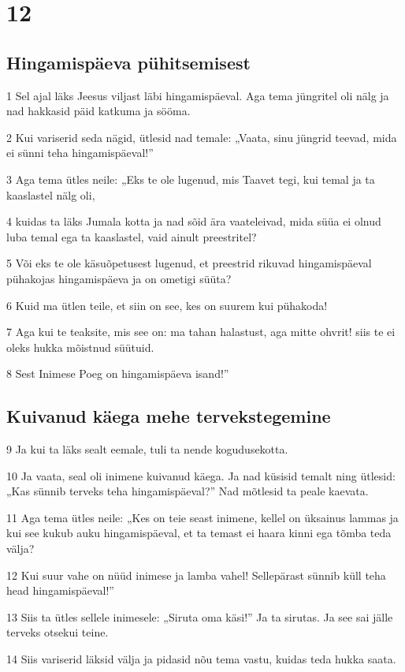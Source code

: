 \chapter{12}

\section*{Hingamispäeva pühitsemisest}

\par 1 Sel ajal läks Jeesus viljast läbi hingamispäeval. Aga tema jüngritel oli nälg ja nad hakkasid päid katkuma ja sööma.
\par 2 Kui variserid seda nägid, ütlesid nad temale: „Vaata, sinu jüngrid teevad, mida ei sünni teha hingamispäeval!”
\par 3 Aga tema ütles neile: „Eks te ole lugenud, mis Taavet tegi, kui temal ja ta kaaslastel nälg oli,
\par 4 kuidas ta läks Jumala kotta ja nad sõid ära vaateleivad, mida süüa ei olnud luba temal ega ta kaaslastel, vaid ainult preestritel?
\par 5 Või eks te ole käsuõpetusest lugenud, et preestrid rikuvad hingamispäeval pühakojas hingamispäeva ja on ometigi süüta?
\par 6 Kuid ma ütlen teile, et siin on see, kes on suurem kui pühakoda!
\par 7 Aga kui te teaksite, mis see on: ma tahan halastust, aga mitte ohvrit! siis te ei oleks hukka mõistnud süütuid.
\par 8 Sest Inimese Poeg on hingamispäeva isand!”

\section*{Kuivanud käega mehe tervekstegemine}

\par 9 Ja kui ta läks sealt eemale, tuli ta nende kogudusekotta.
\par 10 Ja vaata, seal oli inimene kuivanud käega. Ja nad küsisid temalt ning ütlesid: „Kas sünnib terveks teha hingamispäeval?” Nad mõtlesid ta peale kaevata.
\par 11 Aga tema ütles neile: „Kes on teie seast inimene, kellel on üksainus lammas ja kui see kukub auku hingamispäeval, et ta temast ei haara kinni ega tõmba teda välja?
\par 12 Kui suur vahe on nüüd inimese ja lamba vahel! Sellepärast sünnib küll teha head hingamispäeval!”
\par 13 Siis ta ütles sellele inimesele: „Siruta oma käsi!” Ja ta sirutas. Ja see sai jälle terveks otsekui teine.
\par 14 Siis variserid läksid välja ja pidasid nõu tema vastu, kuidas teda hukka saata.

